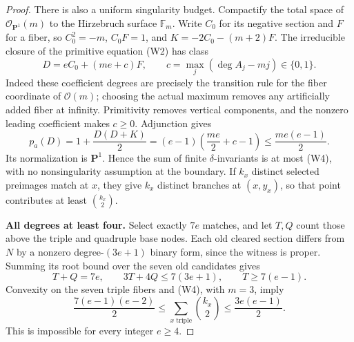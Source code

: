 \begin{proof}
There is also a uniform singularity budget.  Compactify the total space
of $\mathcal O_{\mathbf P^1}(m)$ to the Hirzebruch surface $\mathbb F_m$.
Write $C_0$ for its negative section and $F$ for a fiber, so
$C_0^2=-m$, $C_0F=1$, and $K=-2C_0-(m+2)F$.
The irreducible closure of the primitive equation (W2) has class
\[
 D=eC_0+(me+c)F,\qquad
 c=\max_j(\deg A_j-mj)\in\{0,1\}.
\]
Indeed these coefficient degrees are precisely the transition rule
for the fiber coordinate of $\mathcal O(m)$; choosing the actual
maximum removes any artificially added fiber at infinity.  Primitivity
removes vertical components, and the nonzero leading coefficient makes
$c\ge0$.  Adjunction gives
\[
 p_a(D)=1+\frac{D(D+K)}2
       =(e-1)\left(\frac{me}{2}+c-1\right)
       \le\frac{me(e-1)}2.                            \tag{W4}
\]
Its normalization is $\mathbf P^1$.  Hence the sum of finite
$\delta$-invariants is at most (W4), with no nonsingularity assumption
at the boundary.  If $k_x$ distinct selected preimages match at $x$,
they give $k_x$ distinct branches at $(x,y_x)$, so that point contributes
at least $\binom{k_x}{2}$.

\smallskip\noindent\textbf{All degrees at least four.}
Select exactly $7e$ matches, and let $T,Q$ count those above the triple
and quadruple base nodes.  Each old cleared section differs from $N$
by a nonzero degree-$(3e+1)$ binary form, since the witness is proper.
Summing its root bound over the seven old candidates gives
\[
 T+Q=7e,\qquad 3T+4Q\le7(3e+1),\qquad T\ge7(e-1).
\]
Convexity on the seven triple fibers and (W4), with $m=3$, imply
\[
 \frac{7(e-1)(e-2)}2
 \le\sum_{x\text{ triple}}\binom{k_x}{2}
 \le\frac{3e(e-1)}2.
\]
This is impossible for every integer $e\ge4$.


\end{proof}
